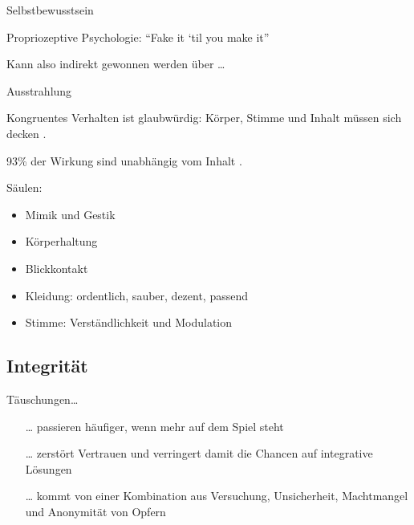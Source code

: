 \begin{frame}{Selbstbewusstsein}

  Propriozeptive Psychologie: \enquote{Fake it `til you make it} \cite[][p. 38]{mccarthy_advanced_2015}


  Kann also indirekt gewonnen werden über \ldots 

\end{frame}

\begin{frame}{Ausstrahlung}

  Kongruentes Verhalten ist glaubwürdig: Körper, Stimme und Inhalt müssen sich decken \cite{wannenwetsch_erfolgreicher_2009}.

  93\% der Wirkung sind unabhängig vom Inhalt \cite{wannenwetsch_erfolgreicher_2009}.


  Säulen:
  \begin{itemize}
    \item Mimik und Gestik 
    \item Körperhaltung
    \item Blickkontakt 
    \item Kleidung: ordentlich, sauber, dezent, passend 
    \item Stimme: Verständlichkeit und Modulation 
  \end{itemize}


\end{frame}


\subsection{Integrität}

\begin{frame}

  Täuschungen\ldots 
  \begin{itemize}
    \item[\ldots]passieren häufiger, wenn mehr auf dem Spiel steht \cites[][p. 292]{bazerman_negotiation_2000}[][p. 501]{thompson_negotiation_2010}
    \item[\ldots]zerstört Vertrauen und verringert damit die Chancen auf integrative Lösungen %
    \item[\ldots]kommt von einer Kombination aus Versuchung, Unsicherheit, Machtmangel und Anonymität von Opfern \cite[][p. 501]{thompson_negotiation_2010}
  \end{itemize}

\end{frame}

